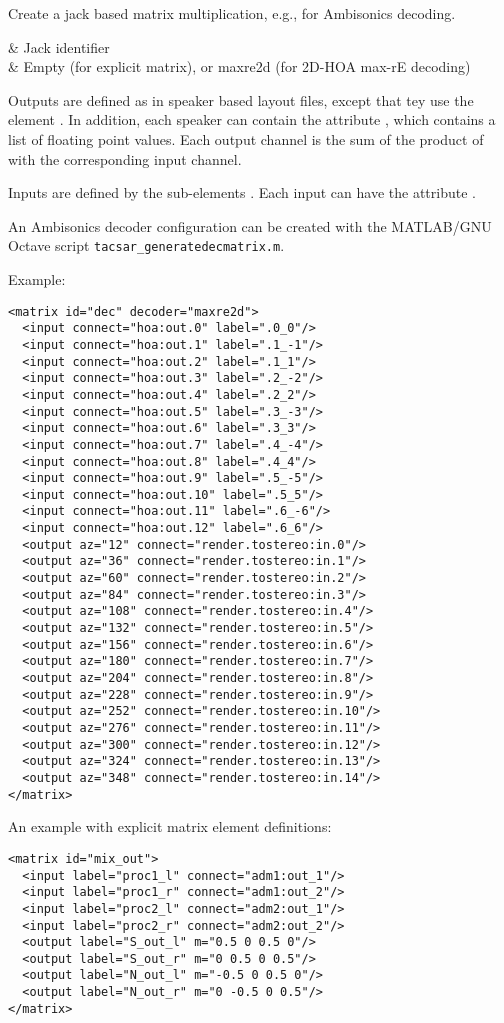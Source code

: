 Create a jack based matrix multiplication, e.g., for Ambisonics decoding.

\begin{tscattributes}
 & Jack identifier\\
 & Empty (for explicit matrix), or maxre2d (for 2D-HOA max-rE decoding)\\
\end{tscattributes}

Outputs are defined as in speaker based layout files, except that tey
use the element .
%
In addition, each speaker can contain the attribute , which
contains a list of floating point values.
%
Each output channel is the sum of the product of  with the
corresponding input channel.

Inputs are defined by the sub-elements .
%
Each input can have the attribute .

An Ambisonics decoder configuration can be created with the MATLAB/GNU
Octave script \verb!tacsar_generatedecmatrix.m!.

Example:
\begin{lstlisting}[numbers=none]
<matrix id="dec" decoder="maxre2d">
  <input connect="hoa:out.0" label=".0_0"/>
  <input connect="hoa:out.1" label=".1_-1"/>
  <input connect="hoa:out.2" label=".1_1"/>
  <input connect="hoa:out.3" label=".2_-2"/>
  <input connect="hoa:out.4" label=".2_2"/>
  <input connect="hoa:out.5" label=".3_-3"/>
  <input connect="hoa:out.6" label=".3_3"/>
  <input connect="hoa:out.7" label=".4_-4"/>
  <input connect="hoa:out.8" label=".4_4"/>
  <input connect="hoa:out.9" label=".5_-5"/>
  <input connect="hoa:out.10" label=".5_5"/>
  <input connect="hoa:out.11" label=".6_-6"/>
  <input connect="hoa:out.12" label=".6_6"/>
  <output az="12" connect="render.tostereo:in.0"/>
  <output az="36" connect="render.tostereo:in.1"/>
  <output az="60" connect="render.tostereo:in.2"/>
  <output az="84" connect="render.tostereo:in.3"/>
  <output az="108" connect="render.tostereo:in.4"/>
  <output az="132" connect="render.tostereo:in.5"/>
  <output az="156" connect="render.tostereo:in.6"/>
  <output az="180" connect="render.tostereo:in.7"/>
  <output az="204" connect="render.tostereo:in.8"/>
  <output az="228" connect="render.tostereo:in.9"/>
  <output az="252" connect="render.tostereo:in.10"/>
  <output az="276" connect="render.tostereo:in.11"/>
  <output az="300" connect="render.tostereo:in.12"/>
  <output az="324" connect="render.tostereo:in.13"/>
  <output az="348" connect="render.tostereo:in.14"/>
</matrix>
\end{lstlisting}

An example with explicit matrix element definitions:
\begin{lstlisting}[numbers=none]
<matrix id="mix_out">
  <input label="proc1_l" connect="adm1:out_1"/>
  <input label="proc1_r" connect="adm1:out_2"/>
  <input label="proc2_l" connect="adm2:out_1"/>
  <input label="proc2_r" connect="adm2:out_2"/>
  <output label="S_out_l" m="0.5 0 0.5 0"/>
  <output label="S_out_r" m="0 0.5 0 0.5"/>
  <output label="N_out_l" m="-0.5 0 0.5 0"/>
  <output label="N_out_r" m="0 -0.5 0 0.5"/>
</matrix>
\end{lstlisting}

